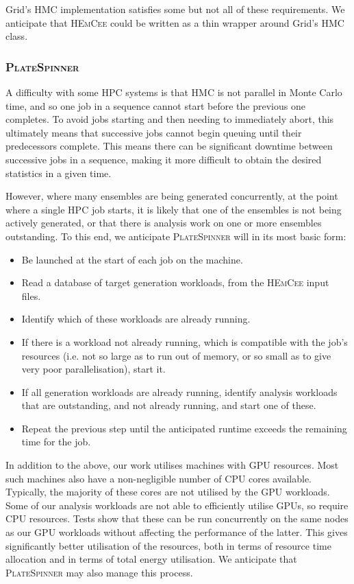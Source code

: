 \documentclass{article}
\newcommand\program[1]{\textsc{#1}\xspace}
\begin{document}
Grid's HMC implementation satisfies some but not all of these requirements.
We anticipate that \program{HEmCee} could be written as a thin wrapper around Grid's HMC class.

\subsubsection{\program{PlateSpinner}}

A difficulty with some HPC systems is that
HMC is not parallel in Monte Carlo time,
and so one job in a sequence cannot start before the previous one completes.
To avoid jobs starting and then needing to immediately abort,
this ultimately means that successive jobs cannot begin queuing until
their predecessors complete.
This means there can be significant downtime between successive jobs in a sequence,
making it more difficult to obtain the desired statistics in a given time.

However,
where many ensembles are being generated concurrently,
at the point where a single HPC job starts,
it is likely that one of the ensembles is not being actively generated,
or that there is analysis work on one or more ensembles outstanding.
To this end,
we anticipate \program{PlateSpinner} will in its most basic form:

\begin{itemize}
  \item
        Be launched at the start of each job on the machine.
  \item
        Read a database of target generation workloads,
        from the \program{HEmCee} input files.
  \item
        Identify which of these workloads are already running.
  \item
        If there is a workload not already running,
        which is compatible with the job's resources
        (i.e. not so large as to run out of memory,
        or so small as to give very poor parallelisation),
        start it.
  \item
        If all generation workloads are already running,
        identify analysis workloads that are outstanding,
        and not already running,
        and start one of these.
  \item
        Repeat the previous step until
        the anticipated runtime exceeds the remaining time for the job.
\end{itemize}

In addition to the above,
our work utilises machines with GPU resources.
Most such machines also have a non-negligible number of CPU cores available.
Typically,
the majority of these cores are not utilised by the GPU workloads.
Some of our analysis workloads are not able to efficiently utilise GPUs,
so require CPU resources.
Tests show that these can be run concurrently on the same nodes as our GPU workloads
without affecting the performance of the latter.
This gives significantly better utilisation of the resources,
both in terms of resource time allocation
and in terms of total energy utilisation.
We anticipate that \program{PlateSpinner} may also manage this process.
\end{document}
